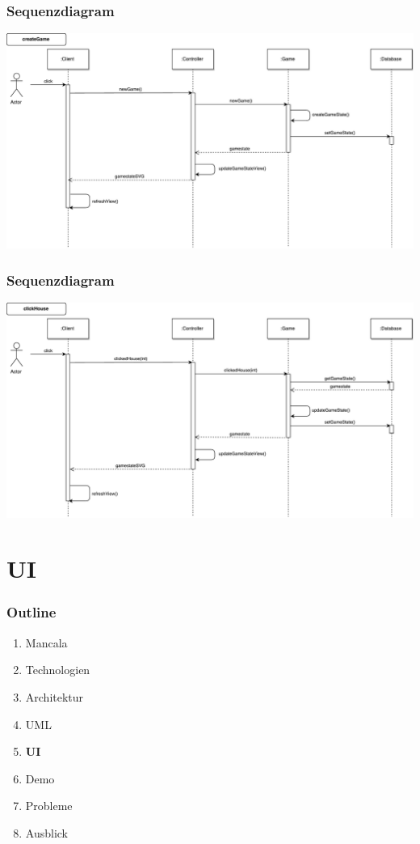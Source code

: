 \documentclass[
	10pt,
	t		%
]{beamer}
\begin{document}
\begin{frame}
\frametitle{Sequenzdiagram}
\begin{center}
\includegraphics[scale=0.32]{./../Diagrams/Sequence_createGame.pdf}
\end{center}
\end{frame}

\begin{frame}
\frametitle{Sequenzdiagram}
\begin{center}
\includegraphics[scale=0.32]{./../Diagrams/Sequence_clickHouse.pdf}
\end{center}
\end{frame}

\section{UI}
\begin{frame}
\frametitle{Outline}
\begin{enumerate}
\item Mancala
\item Technologien
\item Architektur
\item UML
\item \textbf{UI}
\item Demo
\item Probleme
\item Ausblick
\end{enumerate}
\end{frame}
\end{document}
